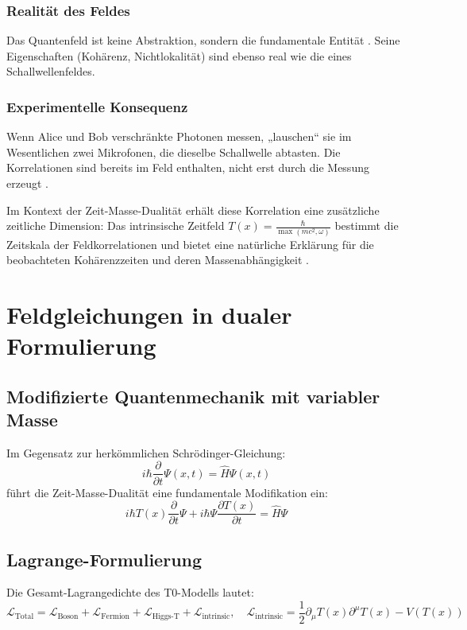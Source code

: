 \documentclass[a4paper,12pt]{article}
\newcommand{\Tfield}{T(x)}
\begin{document}
	\subsubsection{Realität des Feldes}
	Das Quantenfeld ist keine Abstraktion, sondern die fundamentale Entität \cite{Weinberg1995}. Seine Eigenschaften (Kohärenz, Nichtlokalität) sind ebenso real wie die eines Schallwellenfeldes.
	\subsubsection{Experimentelle Konsequenz}
	Wenn Alice und Bob verschränkte Photonen messen, „lauschen“ sie im Wesentlichen zwei Mikrofonen, die dieselbe Schallwelle abtasten. Die Korrelationen sind bereits im Feld enthalten, nicht erst durch die Messung erzeugt \cite{Zeilinger2010}.
	
	Im Kontext der Zeit-Masse-Dualität erhält diese Korrelation eine zusätzliche zeitliche Dimension: Das intrinsische Zeitfeld \( \Tfield = \frac{\hbar}{\max(m c^2, \omega)} \) bestimmt die Zeitskala der Feldkorrelationen und bietet eine natürliche Erklärung für die beobachteten Kohärenzzeiten und deren Massenabhängigkeit \cite{Pascher2024}.
	
	\section{Feldgleichungen in dualer Formulierung}
	\subsection{Modifizierte Quantenmechanik mit variabler Masse}
	Im Gegensatz zur herkömmlichen Schrödinger-Gleichung:
	\begin{equation}
		i\hbar \frac{\partial}{\partial t}\Psi(x,t) = \hat{H}\Psi(x,t)
	\end{equation}
	führt die Zeit-Masse-Dualität eine fundamentale Modifikation ein:
	\begin{equation}
		i\hbar \Tfield \frac{\partial}{\partial t} \Psi + i\hbar \Psi \frac{\partial \Tfield}{\partial t} = \hat{H} \Psi
	\end{equation}
	
	\subsection{Lagrange-Formulierung}
	Die Gesamt-Lagrangedichte des T0-Modells lautet:
	\begin{equation}
		\mathcal{L}_{\text{Total}} = \mathcal{L}_{\text{Boson}} + \mathcal{L}_{\text{Fermion}} + \mathcal{L}_{\text{Higgs-T}} + \mathcal{L}_{\text{intrinsic}}, \quad \mathcal{L}_{\text{intrinsic}} = \frac{1}{2} \partial_\mu \Tfield \partial^\mu \Tfield - V(\Tfield)
	\end{equation}
	
\end{document}
